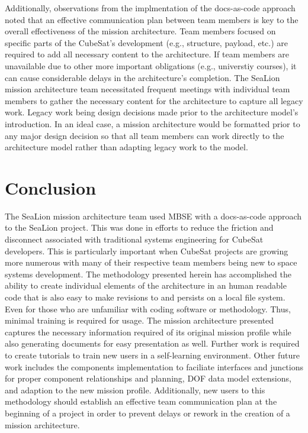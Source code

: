 \documentclass[journal,article,submit,pdftex,moreauthors]{Definitions/mdpi}
\begin{document}
Additionally, observations from the implmentation of the docs-as-code approach noted that an effective communication plan between team members is key to the overall effectiveness of the mission architecture.  Team members focused on specific parts of the CubeSat's development (e.g., structure, payload, etc.) are required to add all necessary content to the architecture.  If team members are unavailable due to other more important obligations (e.g., universtiy courses), it can cause considerable delays in the architecture's completion.  The SeaLion mission architecture team necessitated frequent meetings with individual team members to gather the necessary content for the architecture to capture all legacy work.  Legacy work being design decisions made prior to the architecture model's introduction.  In an ideal case, a mission architecture would be formatted prior to any major design decision so that all team members can work directly to the architecture model rather than adapting legacy work to the model.

\section{Conclusion}
The SeaLion mission architecture team used MBSE with a docs-as-code approach to the SeaLion project. This was done in efforts to reduce the friction and disconnect associated with traditional systems engineering for CubeSat developers.  This is particularly important when CubeSat projects are growing more numerous with many of their respective team members being new to space systems development.  The methodology presented herein has accomplished the ability to create individual elements of the architecture in an human readable code that is also easy to make revisions to and persists on a local file system.  Even for those who are unfamiliar with coding software or methodology.  Thus, minimal training is required for usage.  The mission architecture presented captures the necessary information required of its original mission profile while also generating documents for easy presentation as well.  Further work is required to create tutorials to train new users in a self-learning environment.  Other future work includes the components implementation to faciliate interfaces and junctions for proper component relationships and planning, DOF data model extensions, and adaption to the new mission profile.  Additionally, new users to this methodology should establish an effective team communication plan at the beginning of a project in order to prevent delays or rework in the creation of a mission architecture.    
\end{document}
